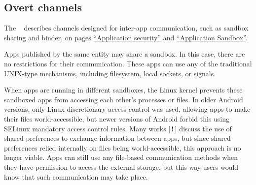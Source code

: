 \documentclass[article, oneside]{aaltoseries}
\newcommand\tocite[1]{
	\todo{\ifstrempty{#1}{Citation needed}{#1}}
	[\,\textbf{\color{red}!}\,]
}
\begin{document}
\subsection{Overt channels}
\label{sec:overt}

The \citeauthor{AOSPsecurity}~\cite{AOSPsecurity} describes channels designed for inter-app communication, such as sandbox sharing and binder, on pages \href{https://source.android.com/security/overview/app-security}{``Application security''} and \href{https://source.android.com/security/app-sandbox}{``Application Sandbox''}.

Apps published by the same entity may share a sandbox. In this case, there are no restrictions for their communication. These apps can use any of the traditional UNIX-type mechanisms, including filesystem, local sockets, or signals.

When apps are running in different sandboxes, the Linux kernel prevents these sandboxed apps from accessing each other's processes or files. In older Android versions, only Linux discretionary access control was used, allowing apps to make their files world-accessible, but newer versions of Android forbid this using SELinux mandatory access control rules. Many works\tocite{} discuss the use of shared preferences to exchange information between apps, but since shared preferences relied internally on files being world-accessible, this approach is no longer viable. Apps can still use any file-based communication methods when they have permission to access the external storage, but this way users would know that such communication may take place.
\end{document}
